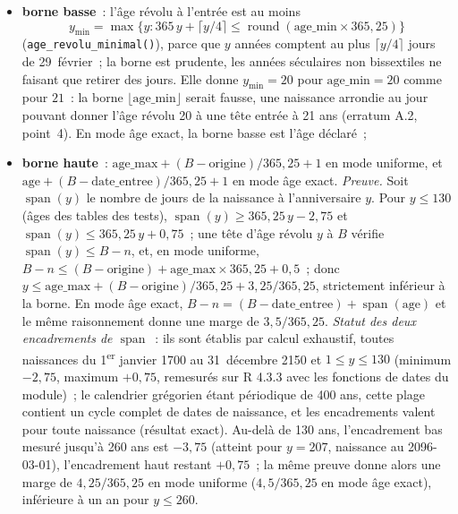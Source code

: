 \documentclass[a4paper,11pt]{article}
\newcommand{\code}[1]{\texttt{\small #1}}
\begin{document}
\begin{itemize}[leftmargin=*, itemsep=2pt]
  \item \textbf{borne basse}~: l'âge révolu à l'entrée est au moins
    \[
      y_{\min} = \max\bigl\{y : 365\,y + \lceil y/4 \rceil \le
      \operatorname{round}(\text{age\_min} \times 365{,}25)\bigr\}
    \]
    (\code{age\_revolu\_minimal()}), parce que $y$ années comptent au plus
    $\lceil y/4 \rceil$ jours de 29~février~; la borne est prudente, les années
    séculaires non bissextiles ne faisant que retirer des jours. Elle donne
    $y_{\min} = 20$ pour $\text{age\_min} = 20$ comme pour $21$~: la borne
    $\lfloor \text{age\_min} \rfloor$ serait fausse, une naissance arrondie au
    jour pouvant donner l'âge révolu 20 à une tête entrée à 21 ans (erratum
    A.2, point~4). En mode âge exact, la borne basse est l'âge déclaré~;
  \item \sloppy \textbf{borne haute}~: $\text{age\_max} + (B - \text{origine})/365{,}25 + 1$
    en mode uniforme, et $\text{age} + (B - \text{date\_entree})/365{,}25 + 1$
    en mode âge exact. \emph{Preuve.} Soit $\operatorname{span}(y)$ le nombre de
    jours de la naissance à l'anniversaire $y$. Pour $y \le 130$ (âges des
    tables des tests), $\operatorname{span}(y) \ge 365{,}25\,y - 2{,}75$ et
    $\operatorname{span}(y) \le 365{,}25\,y + 0{,}75$~; une tête d'âge révolu
    $y$ à $B$ vérifie $\operatorname{span}(y) \le B - n$, et, en mode uniforme,
    $B - n \le (B - \text{origine}) + \text{age\_max} \times 365{,}25 + 0{,}5$~;
    donc $y \le \text{age\_max} + (B - \text{origine})/365{,}25 + 3{,}25/365{,}25$,
    strictement inférieur à la borne. En mode âge exact,
    $B - n = (B - \text{date\_entree}) + \operatorname{span}(\text{age})$ et le
    même raisonnement donne une marge de $3{,}5/365{,}25$.
    \emph{Statut des deux encadrements de $\operatorname{span}$}~: ils sont
    établis par calcul exhaustif, toutes naissances du 1\textsuperscript{er}
    janvier 1700 au 31~décembre 2150 et $1 \le y \le 130$ (minimum $-2{,}75$,
    maximum $+0{,}75$, remesurés sur R 4.3.3 avec les fonctions de dates du
    module)~; le calendrier grégorien étant périodique de 400 ans, cette plage
    contient un cycle complet de dates de naissance, et les encadrements valent
    pour toute naissance (résultat exact). Au-delà de 130 ans, l'encadrement
    bas mesuré jusqu'à 260 ans est $-3{,}75$ (atteint pour $y = 207$,
    naissance au 2096-03-01), l'encadrement haut restant $+0{,}75$~; la même
    preuve donne alors une marge de $4{,}25/365{,}25$ en mode uniforme
    ($4{,}5/365{,}25$ en mode âge exact), inférieure à un an pour $y \le 260$.
\end{itemize}
\end{document}
